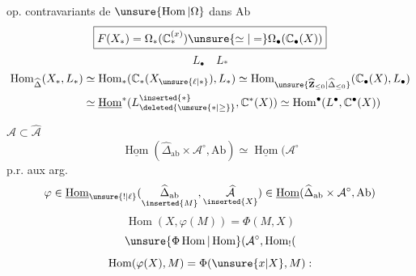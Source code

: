 op. contravariants de $\unsure{\operatorname{Hom}|\Omega}$ dans $\mathrm{Ab}$
\[
\boxed{F(X_*)=\Omega_{*}(\mathbb C_*^{(x)})\unsure{\simeq|=}\Omega_\bullet(\mathbb C_\bullet(X))}
\]
\[
L_\bullet\quad L_*
\]
\[
\begin{aligned}
\operatorname{Hom}_{\widehat\Delta}(X_*,L_*)&\simeq\operatorname{Hom}_{*}(\mathbb C_*(X_{\unsure{\ell|*}}),L_*)\simeq\operatorname{Hom}_{\unsure{\widehat{\mathbf Z}_{\le0}|\widehat\Delta_{\le0}}}(\mathbb C_\bullet(X),L_\bullet)\\
&\simeq\underline{\operatorname{Hom}}^*(L_{\deleted{\unsure{*|\ge}}}^{\inserted{*}},\mathbb C^*(X))\simeq\operatorname{Hom}^\bullet(L^\bullet,\mathbb C^\bullet(X))
\end{aligned}
\]
\margin{$\rightarrow$}

$\mathcal A\subset\widehat{\mathcal A}$
\[
\underline{\operatorname{Hom}}(\widehat\Delta_{\mathrm{ab}}\times\mathcal A^\circ,\mathrm{Ab})\simeq\underline{\operatorname{Hom}}(\mathcal A^\circ
\]
 p.r. aux  arg.
\[
\varphi\in\underline{\operatorname{Hom}}_{\unsure{!|\ell}}(\underset{\inserted{M}}{\widehat\Delta_{\mathrm{ab}}},\underset{\inserted{X}}{\widehat{\mathcal A}})
\in\underline{\operatorname{Hom}}(\widehat\Delta_{\mathrm{ab}}\times\mathcal A^\circ,\mathrm{Ab})
\]
\[
\operatorname{Hom}(X,\varphi(M))=\Phi(M,X)
\]
\[
\unsure{\Phi\operatorname{Hom}|\operatorname{Hom}}(\mathcal A^\circ,\operatorname{Hom}_!(
\]
\deleted{\[
X=\varinjlim_{\unsure{\delta|\Delta}\in(\unsure{\Delta|\widehat\Delta}/X}\unsure{\delta|\Delta}
\]}
\[
\operatorname{Hom}(\varphi(X),M)=\Phi(\unsure{x|X},M):
\]
